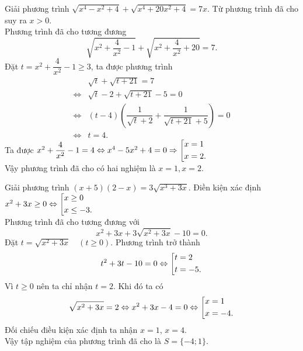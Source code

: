 \begin{bt}%
	Giải phương trình $\sqrt{x^4-x^2+4}+\sqrt{x^4+20x^2+4}=7x$.
	\loigiai
	{
		Từ phương trình đã cho suy ra $x>0.$\\
		Phương trình đã cho tương đương
		$$\sqrt{x^2+\dfrac{4}{x^2}-1}+\sqrt{x^2+\dfrac{4}{x^2}+20}=7.$$
		Đặt $t=x^2+\dfrac{4}{x^2}-1\ge 3$, ta được phương trình
		\begin{align*}
		& \sqrt{t}+\sqrt{t+21}=7\\
		\Leftrightarrow & \sqrt{t}-2+\sqrt{t+21}-5=0 \\
		\Leftrightarrow &(t-4)\left(\dfrac{1}{\sqrt{t}+2}+\dfrac{1}{\sqrt{t+21}+5}\right)=0\\
		\Leftrightarrow & t=4.
		\end{align*}
		Ta được $x^2+\dfrac{4}{x^2}-1=4\Leftrightarrow x^4-5x^2+4=0\Rightarrow\left[\begin{aligned}&x=1\\&x=2.\end{aligned}\right.$\\
		Vậy phương trình đã cho có hai nghiệm là $x=1,x=2.$
	}
\end{bt}


\begin{bt}%
	Giải phương trình $(x+5)(2-x)=3\sqrt{x^3+3x}$.	
	\loigiai
	{
		Điền kiện xác định $x^2+3x\geq 0\Leftrightarrow\left[\begin{aligned}& x\geq 0\\&x\leq -3.\end{aligned}\right.$\\
		Phương trình đã cho tương đương với
		$$x^2+3x+3\sqrt{x^2+3x}-10=0.$$
		Đặt $t=\sqrt{x^2+3x}\quad(t\geq 0)$. Phương trình trở thành
		$$t^2+3t-10=0\Leftrightarrow\left[\begin{aligned}&t=2 \\&t=-5.\end{aligned}\right.$$
		Vì $t \geq 0$ nên ta chỉ nhận $t = 2$. Khi đó ta có
		$$\sqrt{x^2+3x}=2\Leftrightarrow x^2+3x-4=0\Leftrightarrow\left[\begin{aligned}&x=1\\&x=-4.\end{aligned}\right.$$
		Đối chiếu điều kiện xác định ta nhận $x = 1$, $x = 4$.\\
		Vậy tập nghiệm của phương trình đã cho là $S=\{-4;1\}$.
	}
\end{bt}


